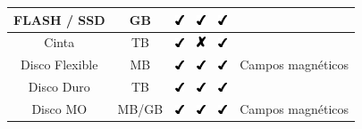 \begin{table}[H]
{\begin{tabular}{c|c|c|c|c|c}
\cline{1-5}
FLASH / SSD & GB & \includegraphics[keepaspectratio=true, width=10px]{figures/Y} & \includegraphics[keepaspectratio=true, width=10px]{figures/Y} & \includegraphics[keepaspectratio=true, width=10px]{figures/Y} &  \\
\hline
Cinta & TB & \includegraphics[keepaspectratio=true, width=10px]{figures/Y} & \includegraphics[keepaspectratio=true, width=10px]{figures/N} & \includegraphics[keepaspectratio=true, width=10px]{figures/Y} & \multirow{3}{*}{Campos magn\'{e}ticos} \\
\cline{1-5}
Disco Flexible & MB & \includegraphics[keepaspectratio=true, width=10px]{figures/Y} & \includegraphics[keepaspectratio=true, width=10px]{figures/Y} & \includegraphics[keepaspectratio=true, width=10px]{figures/Y} &  \\
\cline{1-5}
Disco Duro & TB & \includegraphics[keepaspectratio=true, width=10px]{figures/Y} & \includegraphics[keepaspectratio=true, width=10px]{figures/Y} & \includegraphics[keepaspectratio=true, width=10px]{figures/Y} &  \\
\hline
\multirow{2}{*}{Disco MO} & \multirow{2}{*}{MB/GB} & \multirow{2}{*}{\includegraphics[keepaspectratio=true, width=10px]{figures/Y}} & \multirow{2}{*}{\includegraphics[keepaspectratio=true, width=10px]{figures/Y}} & \multirow{2}{*}{\includegraphics[keepaspectratio=true, width=10px]{figures/Y}} & Campos magn\'{e}ticos\\

\end{tabular}}
\end{table}
